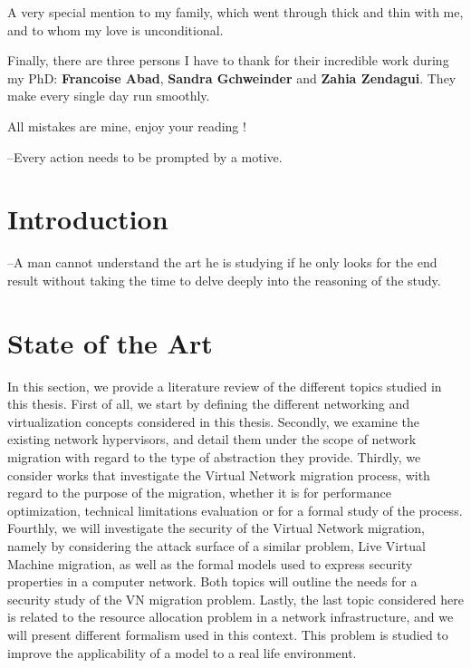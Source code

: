 \documentclass[a4paper, 11pt]{report}
\theoremstyle{definition}
\begin{document}
A very special mention to my family, which went through thick and thin with me, and to whom my love is unconditional. 

Finally, there are three persons I have to thank for their incredible work during my PhD: \textbf{Francoise Abad}, \textbf{Sandra Gchweinder} and \textbf{Zahia Zendagui}. They make every single day run smoothly.

All mistakes are mine, enjoy your reading !

\newpage

\tableofcontents
\listoffigures
 \listoftables
\thispagestyle{empty}


\newpage
{}
\begin{savequote}
--Every action needs to be prompted by a motive.
\end{savequote}
\chapter{Introduction}

 

\newpage
\begin{savequote}[0.5\textwidth]
--A man cannot understand the art he is studying if he only looks for the end result without taking the time to delve deeply into the reasoning of the study.
\end{savequote}
\chapter{State of the Art}
\label{sec:sota}
In this section, we provide a literature review of the different topics studied in this thesis.
First of all, we start by defining the different networking and virtualization concepts considered in this thesis.
Secondly, we examine the existing network hypervisors, and detail them under the scope of network migration with regard to the type of abstraction they provide.
Thirdly, we consider works that investigate the Virtual Network migration process, with regard to the purpose of the migration, whether it is for performance optimization, technical limitations evaluation or for a formal study of the process.
Fourthly, we will investigate the security of the Virtual Network migration, namely by considering the attack surface of a similar problem, Live Virtual Machine migration, as well as the formal models used to express security properties in a computer network.
Both topics will outline the needs for a security study of the VN migration problem.
Lastly, the last topic considered here is related to the resource allocation problem in a network infrastructure, and we will present different formalism used in this context.
This problem is studied to improve the applicability of a model to a real life environment.
\end{document}
